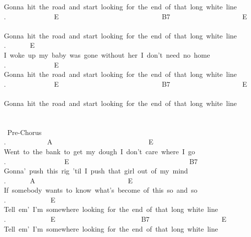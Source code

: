 {Gonna\ hit\ the\ road\ and\ start\ looking\ for\ the\ end\ of\ that\ long\ white\ line\\
.\ \ \ \ \ \ \ \ \ \ \ \ \ \ E\ \ \ \ \ \ \ \ \ \ \ \ \ \ \ \ \ \ \ \ \ \ \ \ \ \ \ \ \ \ B7\ \ \ \ \ \ \ \ \ \ \ \ \ \ \ \ \ \ \ \ \ E\ \ \ \ \ \ \\
Gonna\ hit\ the\ road\ and\ start\ looking\ for\ the\ end\ of\ that\ long\ white\ line\\
.\ \ \ \ \ \ \ E\\
I\ woke\ up\ my\ baby\ was\ gone\ without\ her\ I\ don't\ need\ no\ home\\
.\ \ \ \ \ \ \ \ \ \ \ \ \ \ E\\
Gonna\ hit\ the\ road\ and\ start\ looking\ for\ the\ end\ of\ that\ long\ white\ line\\
.\ \ \ \ \ \ \ \ \ \ \ \ \ \ E\ \ \ \ \ \ \ \ \ \ \ \ \ \ \ \ \ \ \ \ \ \ \ \ \ \ \ \ \ \ B7\ \ \ \ \ \ \ \ \ \ \ \ \ \ \ \ \ \ \ \ \ E\ \ \ \ \ \ \\
Gonna\ hit\ the\ road\ and\ start\ looking\ for\ the\ end\ of\ that\ long\ white\ line\\
\\
\\
\lbrack\ Pre-Chorus\rbrack\\
.\ \ \ \ \ \ \ \ \ \ \ \ A\ \ \ \ \ \ \ \ \ \ \ \ \ \ \ \ \ \ \ \ \ \ \ \ \ \ \ \ E\ \\
Went\ to\ the\ bank\ to\ get\ my\ dough\ I\ don't\ care\ where\ I\ go\\
.\ \ \ \ \ \ \ \ \ \ \ \ \ \ \ \ \ E\ \ \ \ \ \ \ \ \ \ \ \ \ \ \ \ \ \ \ \ \ \ \ \ \ \ \ \ \ \ \ \ \ \ \ B7\ \\
Gonna'\ push\ this\ rig\ 'til\ I\ push\ that\ girl\ out\ of\ my\ mind\\
.\ \ \ \ \ \ \ A\ \ \ \ \ \ \ \ \ \ \ \ \ \ \ \ \ \ \ \ \ \ \ \ \ \ \ E\ \ \ \\
If\ somebody\ wants\ to\ know\ what's\ become\ of\ this\ so\ and\ so\\
.\ \ \ \ \ \ \ \ \ \ \ \ \ E\\
Tell\ em'\ I'm\ somewhere\ looking\ for\ the\ end\ of\ that\ long\ white\ line\\
.\ \ \ \ \ \ \ \ \ \ \ \ \ E\ \ \ \ \ \ \ \ \ \ \ \ \ \ \ \ \ \ \ \ \ \ \ \ \ B7\ \ \ \ \ \ \ \ \ \ \ \ \ \ \ \ \ \ \ \ \ E\ \\
Tell\ em'\ I'm\ somewhere\ looking\ for\ the\ end\ of\ that\ long\ white\ line\\
\\
\\
}

